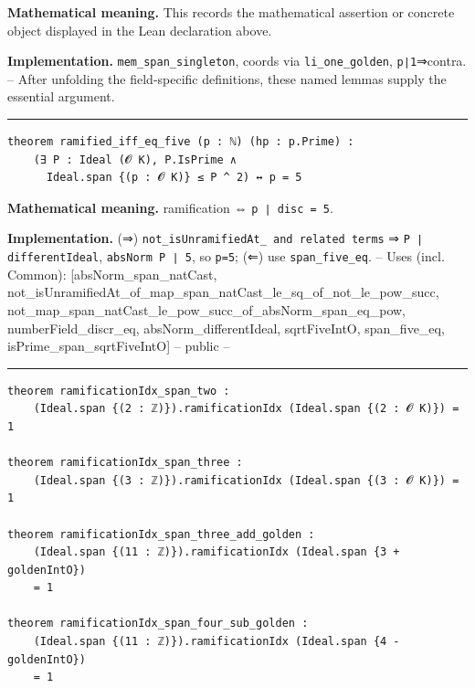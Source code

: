 \documentclass[UTF8,a4paper,11pt,fontset=fandol]{ctexart}
\theoremstyle{definition}
\newcommand{\statementsep}{\par\medskip\hrule\medskip}
\begin{document}
\noindent\textbf{Mathematical meaning.} This records the mathematical assertion or concrete object displayed in the Lean declaration above.\par
\noindent\textbf{Implementation.} \texttt{mem\_\allowbreak{}span\_\allowbreak{}singleton}, coords via \texttt{li\_\allowbreak{}one\_\allowbreak{}golden}, \texttt{p∣1}⇒contra. -- After unfolding the field-specific definitions, these named lemmas supply the essential argument.\par
\statementsep
\begin{verbatim}
theorem ramified_iff_eq_five (p : ℕ) (hp : p.Prime) :
    (∃ P : Ideal (𝓞 K), P.IsPrime ∧
      Ideal.span {(p : 𝓞 K)} ≤ P ^ 2) ↔ p = 5
\end{verbatim}
\noindent\textbf{Mathematical meaning.} ramification ⇔ \texttt{p ∣ disc = 5}.\par
\noindent\textbf{Implementation.} (⇒) \texttt{not\_\allowbreak{}isUnramifiedAt\_\allowbreak{} and related terms} ⇒ \texttt{P ∣ differentIdeal}, \texttt{absNorm P ∣ 5}, so \texttt{p=5}; (⇐) use \texttt{span\_\allowbreak{}five\_\allowbreak{}eq}. -- Uses (incl. Common): [absNorm\_\allowbreak{}span\_\allowbreak{}natCast, not\_\allowbreak{}isUnramifiedAt\_\allowbreak{}of\_\allowbreak{}map\_\allowbreak{}span\_\allowbreak{}natCast\_\allowbreak{}le\_\allowbreak{}sq\_\allowbreak{}of\_\allowbreak{}not\_\allowbreak{}le\_\allowbreak{}pow\_\allowbreak{}succ, not\_\allowbreak{}map\_\allowbreak{}span\_\allowbreak{}natCast\_\allowbreak{}le\_\allowbreak{}pow\_\allowbreak{}succ\_\allowbreak{}of\_\allowbreak{}absNorm\_\allowbreak{}span\_\allowbreak{}eq\_\allowbreak{}pow, numberField\_\allowbreak{}discr\_\allowbreak{}eq, absNorm\_\allowbreak{}differentIdeal, sqrtFiveIntO, span\_\allowbreak{}five\_\allowbreak{}eq, isPrime\_\allowbreak{}span\_\allowbreak{}sqrtFiveIntO] -- public --\par
\statementsep
\begin{verbatim}
theorem ramificationIdx_span_two :
    (Ideal.span {(2 : ℤ)}).ramificationIdx (Ideal.span {(2 : 𝓞 K)}) = 1

theorem ramificationIdx_span_three :
    (Ideal.span {(3 : ℤ)}).ramificationIdx (Ideal.span {(3 : 𝓞 K)}) = 1

theorem ramificationIdx_span_three_add_golden :
    (Ideal.span {(11 : ℤ)}).ramificationIdx (Ideal.span {3 + goldenIntO})
    = 1

theorem ramificationIdx_span_four_sub_golden :
    (Ideal.span {(11 : ℤ)}).ramificationIdx (Ideal.span {4 - goldenIntO})
    = 1
\end{verbatim}
\end{document}
